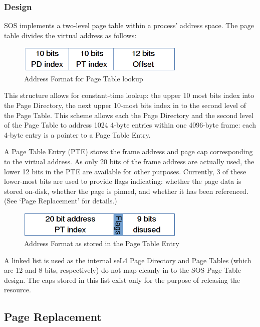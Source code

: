 \documentclass[a4paper,12pt]{article}
\begin{document}
\subsubsection{Design}
SOS implements a two-level page table within a process' address space.  The
page table divides the virtual address as follows:

\begin{figure}[h!]
  \centering
  \includegraphics[width=80mm]{add-format.png}
  \caption{Address Format for Page Table lookup}
\end{figure}

This structure allows for constant-time lookup: the upper 10 most bits index
into the Page Directory, the next upper 10-most bits index in to the second
level of the Page Table.  This scheme allows each the Page Directory and the
second level of the Page Table to address 1024 4-byte entries within one
4096-byte frame: each 4-byte entry is a pointer to a Page Table Entry.

A Page Table Entry (PTE) stores the frame address and page cap corresponding
to the virtual address.  As only 20 bits of the frame address are actually
used, the lower 12 bits in the PTE are available for other purposes.
Currently, 3 of these lower-most bits are used to provide flags indicating:
whether the page data is stored on-disk, whether the page is pinned, and
whether it has been referenced.  (See `Page Replacement' for details.)

\begin{figure}[h!]
  \centering
  \includegraphics[width=80mm]{pte-addr-format.png}
  \caption{Address Format as stored in the Page Table Entry}
\end{figure}

A linked list is used as the internal seL4 Page Directory and Page Tables
(which are 12 and 8 bits, respectively) do not map cleanly in to the SOS Page
Table design.  The caps stored in this list exist only for the purpose of
releasing the resource.

\subsection{Page Replacement}
\end{document}
